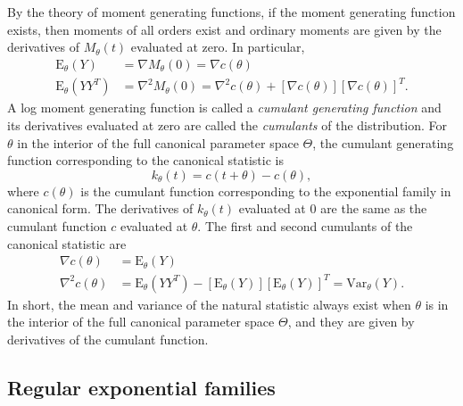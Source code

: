 \documentclass[
]{article}
\begin{document}
By the theory of moment generating functions, if the moment generating
function exists, then moments of all orders exist and ordinary moments
are given by the derivatives of \(M_\theta(t)\) evaluated at zero. In
particular, \begin{align*}
  \mathrm{E}_\theta(Y) &= \nabla M_\theta(0) = \nabla c(\theta) \\  
  \mathrm{E}_\theta(YY^T) &= \nabla^2 M_\theta(0) = \nabla^2 c(\theta) + [\nabla c(\theta)][\nabla c(\theta)]^T.      
\end{align*} A log moment generating function is called a
\emph{cumulant generating function} and its derivatives evaluated at
zero are called the \emph{cumulants} of the distribution. For \(\theta\)
in the interior of the full canonical parameter space \(\Theta\), the
cumulant generating function corresponding to the canonical statistic is
\begin{equation} \label{cgf}
  k_\theta(t) = c(t + \theta) - c(\theta),  
\end{equation} where \(c(\theta)\) is the cumulant function
corresponding to the exponential family in canonical form. The
derivatives of \(k_\theta(t)\) evaluated at 0 are the same as the
cumulant function \(c\) evaluated at \(\theta\). The first and second
cumulants of the canonical statistic are \begin{equation} \label{cumrel}
\begin{split}
    \nabla c(\theta) &= \mathrm{E}_\theta(Y) \\
    \nabla^2 c(\theta) &= \mathrm{E}_\theta(YY^T) - \left[\mathrm{E}_\theta(Y)\right]\left[\mathrm{E}_\theta(Y)\right]^T = \mathrm{Var}_\theta(Y).  
\end{split}
\end{equation} In short, the mean and variance of the natural statistic
always exist when \(\theta\) is in the interior of the full canonical
parameter space \(\Theta\), and they are given by derivatives of the
cumulant function.

\vspace{0.5cm}


\hypertarget{regular-exponential-families}{%
\subsection{Regular exponential
families}\label{regular-exponential-families}}
\end{document}
